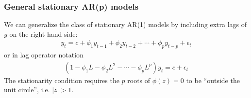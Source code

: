 \documentclass[a4paper,twoside,11pt]{article}
\begin{document}
\subsubsection{General stationary AR(p) models}
We can generalize the class of stationary AR(1) models by including extra lags of $y$ on the right hand side:
\begin{equation*}
\begin{aligned}
y_t = c + \phi_1 y_{t-1} + \phi_2 y_{t-2}+ \cdots + \phi_p y_{t-p} + \epsilon_t
\end{aligned}
\end{equation*}
or in lag operator notation
\begin{equation*}
\begin{aligned}
(1- \phi_1 L - \phi_2 L^2 - \cdots - \phi_p L^p)y_t = c+ \epsilon_t
\end{aligned}
\end{equation*}
The stationarity condition requires the $p$ roots of $\phi(z)=0$ to be “outside the unit circle”, i.e. $|z| > 1$.
\end{document}
